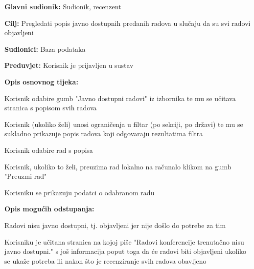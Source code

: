 					\noindent {}
					\begin{packed_item}
						
						\item \textbf{Glavni sudionik: } Sudionik, recenzent
						\item  \textbf{Cilj:} Pregledati popis javno dostupnih predanih radova u slučaju da su svi radovi objavljeni 
						\item  \textbf{Sudionici:} Baza podataka
						\item  \textbf{Preduvjet:} Korisnik je prijavljen u sustav
						\item  \textbf{Opis osnovnog tijeka:}
						
						\item[] \begin{packed_enum}
							\item Korisnik odabire gumb "Javno dostupni radovi" iz izbornika te mu se učitava stranica s popisom svih radova
							\item Korisnik (ukoliko želi) unosi ograničenja u filtar (po sekciji, po državi) te mu se sukladno prikazuje popis radova koji odgovaraju rezultatima filtra
							\item Korisnik odabire rad s popisa
							\item Korisnik, ukoliko to želi, preuzima rad lokalno na računalo klikom na gumb "Preuzmi rad"
							\item Korisniku se prikazuju podatci o odabranom radu	
						\end{packed_enum}  

						\item \textbf{Opis mogućih odstupanja:}
						\item[] \begin{packed_enum}
						
							\item[1.a] Radovi nisu javno dostupni, tj. objavljeni jer nije došlo do potrebe za tim
							\item[] \begin{packed_enum}
								\item[1.] Korisniku je učitana stranica na kojoj piše "Radovi konferencije trenutačno nisu javno dostupni." s još informacija poput toga da će radovi biti objavljeni ukoliko se ukaže potreba ili nakon što je recenziranje svih radova obavljeno
							\end{packed_enum}
 
						\end{packed_enum}

					\end{packed_item}              
				
